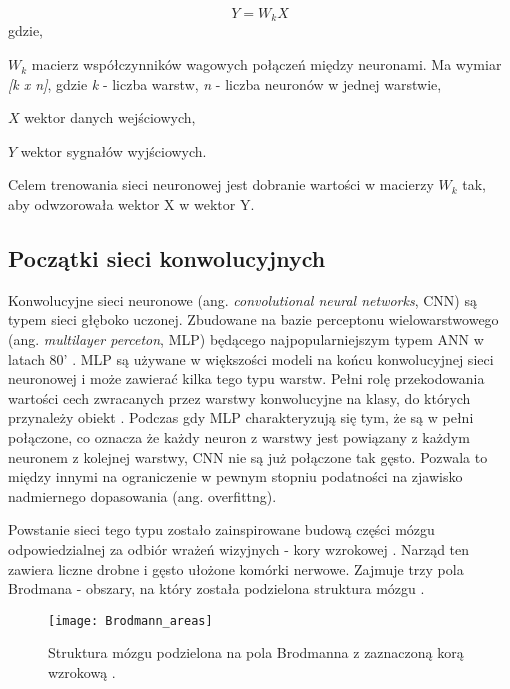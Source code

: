 \begin{equation}
Y = W_k X
\end{equation}
gdzie,
\begin{eqwhere}[2cm]
	\item[$W_k$] macierz współczynników wagowych połączeń między neuronami. Ma wymiar \textit{[k x n]}, gdzie \textit{k} - liczba warstw, \textit{n} - liczba neuronów w jednej warstwie,
	\item[$X$] wektor danych wejściowych,
	\item[$Y$] wektor sygnałów wyjściowych.
\end{eqwhere}

Celem trenowania sieci neuronowej jest dobranie wartości w macierzy \textit{$W_k$} tak, aby odwzorowała wektor X w wektor Y. 

\subsection{Początki sieci konwolucyjnych}

Konwolucyjne sieci neuronowe (ang. \textit{convolutional neural networks}, CNN) są typem sieci głęboko uczonej. Zbudowane na bazie perceptonu wielowarstwowego (ang. \textit{multilayer perceton}, MLP) \cite{deep_learning} będącego  najpopularniejszym typem ANN w latach 80' \cite{Wasserman1988NeuralNI}. MLP są używane w większości modeli na końcu konwolucyjnej sieci neuronowej i może zawierać kilka tego typu warstw. Pełni rolę przekodowania wartości cech zwracanych przez warstwy konwolucyjne na klasy, do których przynależy obiekt \cite{Krizhevsky2012ImageNetCW}. Podczas gdy MLP charakteryzują się tym, że są w pełni połączone, co oznacza że każdy neuron z warstwy jest powiązany z każdym neuronem z kolejnej warstwy, CNN nie są już połączone tak gęsto. Pozwala to między innymi na ograniczenie w pewnym stopniu podatności na zjawisko nadmiernego dopasowania (ang. {overfittng}). 

Powstanie sieci tego typu zostało zainspirowane budową części mózgu odpowiedzialnej za odbiór wrażeń wizyjnych - kory wzrokowej \cite{Matsugu2003SubjectIF}. Narząd ten zawiera liczne drobne i gęsto ułożone komórki nerwowe. Zajmuje trzy pola Brodmana - obszary, na który została podzielona struktura mózgu \cite{Brodmann1985VergleichendeLD}. 

\begin{figure}[h]
	\centering
	\centering
		\texttt{[image: Brodmann\_areas]}	
	\caption{Struktura mózgu podzielona na pola Brodmanna z zaznaczoną korą wzrokową \cite{brodmann_areas}.}
\end{figure}

